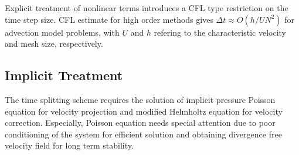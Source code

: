 \documentclass[11pt,a4paper,twoside]{article}
\begin{document}
	
	Explicit treatment of nonlinear terms introduces a CFL type restriction on the time step size. CFL estimate for high order methods gives $ \Delta t \approx O(h/U N^2)$  for advection model problems, with $ U $ and $ h $ refering to the characteristic velocity and mesh size, respectively.
	\subsection{Implicit Treatment}
	
	
	
	The time splitting scheme requires the solution of implicit pressure Poisson equation for velocity projection and  modified Helmholtz equation for velocity correction. Especially, Poisson equation needs special attention due to poor conditioning of  the system for  efficient solution and obtaining  divergence free velocity field for long term stability. 
	
\end{document}
